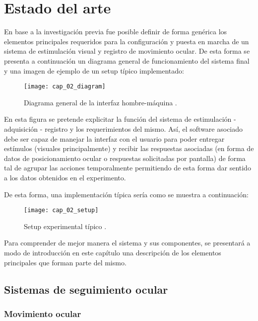 \documentclass[../main.tex]{subfiles}
\begin{document}
		
\chapter{Estado del arte}
\label{cha:02_estado_del_arte}

	En base a la investigación previa fue posible definir de forma genérica los elementos principales requeridos para la configuración y puesta en marcha de un sistema de estimulación visual y registro de movimiento ocular. De esta forma se presenta a continuación un diagrama general de funcionamiento del sistema final y una imagen de ejemplo de un setup típico implementado:   

	\begin{figure}[H]
		\centering
		\texttt{[image: cap\_02\_diagram]}
		\caption{Diagrama general de la interfaz hombre-máquina \cite{website:baseInfo}.}
		\label{fig:02_diagrama_interfaz}
	\end{figure}

	En esta figura se pretende explicitar la función del sistema de estimulación - adquisición - registro y los requerimientos del mismo. Así, el software asociado debe ser capaz de manejar la interfaz con el usuario para poder entregar estímulos (visuales principalmente) y recibir las respuestas asociadas (en forma de datos de posicionamiento ocular o respuestas solicitadas por pantalla) de forma tal de agrupar las acciones temporalmente permitiendo de esta forma dar sentido a los datos obtenidos en el experimento. 

	\newpage
	De esta forma, una implementación típica sería como se muestra a continuación:  

	\begin{figure}[H]
		\centering
		\texttt{[image: cap\_02\_setup]}
		\caption{Setup experimental típico \cite{website:baseInfo}.}
		\label{fig:02_ejemplo_setup}
	\end{figure}

	Para comprender de mejor manera el sistema y sus componentes, se presentará a modo de introducción en este capítulo una descripción de los elementos principales que forman parte del mismo. 

	\section{Sistemas de seguimiento ocular}
	\label{sec:02_sistemas_de_seguimiento_ocular}
		\subsection{Movimiento ocular}
		\label{sub:02_movimiento_ocular}
\end{document}
